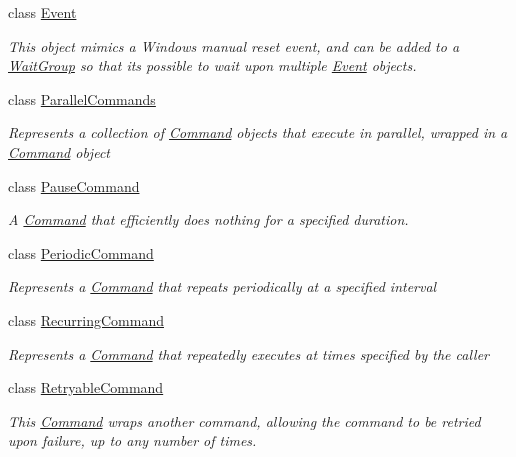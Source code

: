 \begin{DoxyCompactItemize}
class \mbox{\hyperlink{class_command_lib_1_1_event}{Event}}
\begin{DoxyCompactList}\small\item\em This object mimics a Windows manual reset event, and can be added to a \mbox{\hyperlink{class_command_lib_1_1_wait_group}{Wait\+Group}} so that it\textquotesingle{}s possible to wait upon multiple \mbox{\hyperlink{class_command_lib_1_1_event}{Event}} objects. \end{DoxyCompactList}\item 
class \mbox{\hyperlink{class_command_lib_1_1_parallel_commands}{Parallel\+Commands}}
\begin{DoxyCompactList}\small\item\em Represents a collection of \mbox{\hyperlink{class_command_lib_1_1_command}{Command}} objects that execute in parallel, wrapped in a \mbox{\hyperlink{class_command_lib_1_1_command}{Command}} object\end{DoxyCompactList}\item 
class \mbox{\hyperlink{class_command_lib_1_1_pause_command}{Pause\+Command}}
\begin{DoxyCompactList}\small\item\em A \mbox{\hyperlink{class_command_lib_1_1_command}{Command}} that efficiently does nothing for a specified duration.\end{DoxyCompactList}\item 
class \mbox{\hyperlink{class_command_lib_1_1_periodic_command}{Periodic\+Command}}
\begin{DoxyCompactList}\small\item\em Represents a \mbox{\hyperlink{class_command_lib_1_1_command}{Command}} that repeats periodically at a specified interval\end{DoxyCompactList}\item 
class \mbox{\hyperlink{class_command_lib_1_1_recurring_command}{Recurring\+Command}}
\begin{DoxyCompactList}\small\item\em Represents a \mbox{\hyperlink{class_command_lib_1_1_command}{Command}} that repeatedly executes at times specified by the caller\end{DoxyCompactList}\item 
class \mbox{\hyperlink{class_command_lib_1_1_retryable_command}{Retryable\+Command}}
\begin{DoxyCompactList}\small\item\em This \mbox{\hyperlink{class_command_lib_1_1_command}{Command}} wraps another command, allowing the command to be retried upon failure, up to any number of times. \end{DoxyCompactList}\item 

\end{DoxyCompactItemize}
